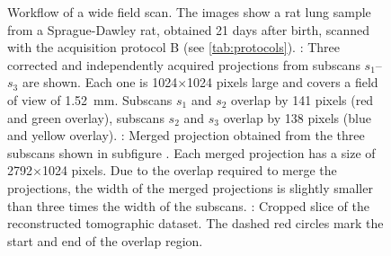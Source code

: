\begin{figure}
{{%
			\label{subfig:workflow-reconstruction}%
		}%
	}%
	\caption[Workflow of a wide field scan]{Workflow of a wide field scan. The images show a rat lung sample from a Sprague-Dawley rat, obtained 21 days after birth, scanned with the acquisition protocol B (see \autoref{tab:protocols}). %
			: Three corrected and independently acquired projections from subscans $s_1$--$s_3$ are shown. Each one is 1024\(\times\)1024 pixels large and covers a field of view of \SI{1.52}{\milli\meter}. Subscans $s_1$ and $s_2$ overlap by 141 pixels (red and green overlay), subscans $s_2$ and $s_3$ overlap by 138 pixels (blue and yellow overlay). %
			: Merged projection obtained from the three subscans shown in subfigure . Each merged projection has a size of 2792\(\times\)1024 pixels. Due to the overlap required to merge the projections, the width of the merged projections is slightly smaller than three times the width of the subscans. %
			: Cropped slice of the reconstructed tomographic dataset. The dashed red circles mark the start and end of the overlap region.}
	\label{fig:wide-field-scan-results}
\end{figure}

